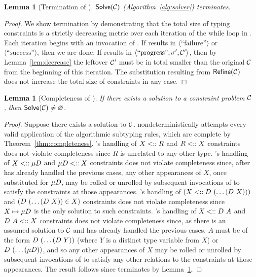 \documentclass[pdflatex,sn-mathphys-num]{sn-jnl}%
\theoremstyle{thmstyleone}%
\newtheorem{lemma}[theorem]{Lemma}%
\theoremstyle{thmstyletwo}%
\theoremstyle{thmstylethree}%
\begin{document}
\begin{lemma}[Termination of ]
  \label{lem:solver-termination}
  $\textsf{Solve}(\mathcal{C})$ (Algorithm~\ref{alg:solver}) terminates.
\end{lemma}
\begin{proof}
  We show termination by demonstrating that the total size of typing constraints is a strictly decreasing metric over each iteration of the while loop in .
  Each iteration begins with an invocation of .
  If  results in $\langle \text{``failure''} \rangle$ or $\langle \text{``success''} \rangle$, then we are done.
  If  results in $\langle \text{``progress''}, \sigma', \mathcal{C}' \rangle$, then by Lemma~\ref{lem:decrease} the leftover $\mathcal{C}'$ must be in total smaller than the original $\mathcal{C}$ from the beginning of this iteration.
  The substitution resulting from $\textsf{Refine}(\mathcal{C})$ does not increase the total size of constraints in any case.
\end{proof}

\begin{lemma}[Completeness of ]
  \label{lem:solver-completeness}
  If there exists a solution to a constraint problem $\mathcal{C}$, then $\textsf{Solve}(\mathcal{C}) \neq \varnothing$.
\end{lemma}
\begin{proof}
  Suppose there exists a solution to $\mathcal{C}$.
   nondeterministically attempts every valid application of the algorithmic subtyping rules, which are complete by Theorem~\ref{thm:completeness}.
  's handling of $X \mathrel{<::} R$ and $R \mathrel{<::} X$ constraints does not violate completeness since $R$ is unrelated to any other type.
  's handling of $X \mathrel{<::} \mu D$ and $\mu D \mathrel{<::} X$ constraints does not violate completeness since, after  has already handled the previous cases, any other appearances of $X$, once substituted for $\mu D$, may be rolled or unrolled by subsequent invocations of  to satisfy the constraints at those appearances.
  's handling of $(X \mathrel{<::} D ~ (\dots (D ~ X)))$ and $(D ~ (\dots (D ~ X)) \in X)$ constraints does not violate completeness since $X \mapsto \mu D$ is the only solution to such constraints.
  's handling of $X \mathrel{<::} D ~ A$ and $D ~ A \mathrel{<::} X$ constraints does not violate completeness since, as there is an assumed solution to $\mathcal{C}$ and  has already handled the previous cases, $A$ must be of the form $D ~ (\dots (D ~ Y))$ (where $Y$ is a distinct type variable from $X$) or $D ~ (\dots (\mu D))$, and so any other appearances of $X$ may be rolled or unrolled by subsequent invocations of  to satisfy any other relations to the constraints at those appearances.
  The result follows since  terminates by Lemma~\ref{lem:solver-termination}.
\end{proof}
\end{document}
